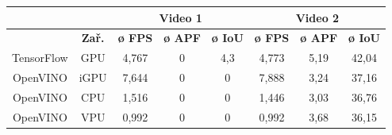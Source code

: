 \begin{table}[H]
  \centering
  \begin{tabular}{cc|ccc|ccc|}
  \cline{3-8}
                                                               &                              & \multicolumn{3}{c|}{\cellcolor[HTML]{CBCEFB}\textbf{Video 1}}                                                                              & \multicolumn{3}{c|}{\cellcolor[HTML]{CBCEFB}\textbf{Video 2}}                                                                              \\ \hline
  \rowcolor[HTML]{E0DBDB} 
  \multicolumn{1}{|c|}{\cellcolor[HTML]{E0DBDB}\textbf{Model}} & \textbf{Zař.}                & \multicolumn{1}{c|}{\cellcolor[HTML]{E0DBDB}\textbf{ø FPS}} & \multicolumn{1}{c|}{\cellcolor[HTML]{E0DBDB}\textbf{ø APF}} & \textbf{ø IoU} & \multicolumn{1}{c|}{\cellcolor[HTML]{E0DBDB}\textbf{ø FPS}} & \multicolumn{1}{c|}{\cellcolor[HTML]{E0DBDB}\textbf{ø APF}} & \textbf{ø IoU} \\ \hline
  \multicolumn{1}{|c|}{\cellcolor[HTML]{E0DBDB}TensorFlow}     & \cellcolor[HTML]{E0DBDB}GPU  & \multicolumn{1}{c|}{4,767}                                  & \multicolumn{1}{c|}{0}                                      & 4,3            & \multicolumn{1}{c|}{4,773}                                  & \multicolumn{1}{c|}{5,19}                                   & 42,04          \\ \hline
  \multicolumn{1}{|c|}{\cellcolor[HTML]{E0DBDB}OpenVINO}       & \cellcolor[HTML]{E0DBDB}iGPU & \multicolumn{1}{c|}{7,644}                                  & \multicolumn{1}{c|}{0}                                      & 0              & \multicolumn{1}{c|}{7,888}                                  & \multicolumn{1}{c|}{3,24}                                   & 37,16          \\ \hline
  \multicolumn{1}{|c|}{\cellcolor[HTML]{E0DBDB}OpenVINO}       & \cellcolor[HTML]{E0DBDB}CPU  & \multicolumn{1}{c|}{1,516}                                  & \multicolumn{1}{c|}{0}                                      & 0              & \multicolumn{1}{c|}{1,446}                                  & \multicolumn{1}{c|}{3,03}                                   & 36,76          \\ \hline
  \multicolumn{1}{|c|}{\cellcolor[HTML]{E0DBDB}OpenVINO}       & \cellcolor[HTML]{E0DBDB}VPU  & \multicolumn{1}{c|}{0,992}                                  & \multicolumn{1}{c|}{0}                                      & 0              & \multicolumn{1}{c|}{0,992}                                  & \multicolumn{1}{c|}{3,68}                                   & 36,15          \\ \hline

\end{tabular}
\end{table}
